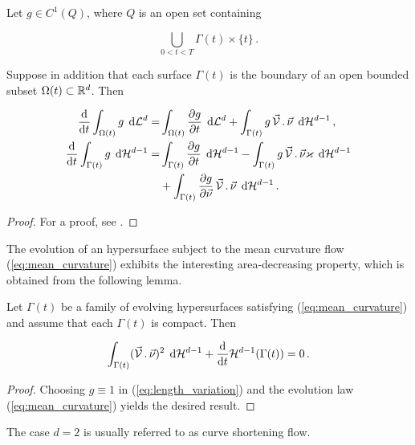 \begin{lemma}
Let $g \in C^1(Q)$, where $Q$ is an open set containing

\begin{equation}
\bigcup_{0 < t < T} \Gamma(t) \times \{ t \} \, .
\end{equation}

Suppose in addition that each surface $\Gamma(t)$ is the boundary of an open
bounded subset $\Omega(t) \subset {\mathbb R}^d$. Then

\begin{align}
\frac{\rm d}{{\rm d}t} \int_{\Omega(t)} g \, \;{\rm d}{\cal L}^{d}  = &
\int_{\Omega(t)} \frac{\partial g}{\partial t} \, \;{\rm d}{\cal L}^{d}
+ \int_{\Gamma(t)} g \,\vec{\mathcal{V}}\,.\,\vec\nu \, \;{\rm d}{\cal H}^{d-1} \, ,
\label{eq:volume_variation} \\
\frac{\rm d}{{\rm d}t} \int_{\Gamma(t)} g \, \;{\rm d}{\cal H}^{d-1}  = &
\int_{\Gamma(t)} \frac{\partial g}{\partial t} \, \;{\rm d}{\cal H}^{d-1} -
\int_{\Gamma(t)} g \, \vec{\mathcal{V}}\,.\,\vec\nu \varkappa \, \;{\rm d}{\cal H}^{d-1}
\nonumber \\
& + \int_{\Gamma(t)} \frac{\partial g}{\partial \vec \nu}\,
\vec{\mathcal{V}}\,.\,\vec\nu \, \;{\rm d}{\cal H}^{d-1} \, .
\label{eq:length_variation}
\end{align}
\end{lemma}

\begin{proof}
For a proof, see \cite[\S~2.6, Lemma 2.1]{DeckelnickDE05}.
\end{proof}

The evolution of an hypersurface subject to the mean curvature flow
(\ref{eq:mean_curvature}) exhibits the interesting area-decreasing property,
which is obtained from the following lemma.

\begin{lemma}
Let $\Gamma(t)$ be a family of evolving hypersurfaces
satisfying (\ref{eq:mean_curvature}) and assume that each $\Gamma(t)$ is
compact. Then

\begin{equation}
\int_{\Gamma(t)} (\vec{\mathcal{V}}\,.\,\vec\nu)^2 \, \;{\rm d}{\cal H}^{d-1} +
\frac{\rm d}{{\rm d}t} \mathcal{H}^{d-1}(\Gamma(t)) = 0 \, . \label{eq:length_decrease}
\end{equation}

\end{lemma}

\begin{proof}
Choosing $g \equiv 1$ in (\ref{eq:length_variation}) and the evolution law
(\ref{eq:mean_curvature}) yields the desired result.
\end{proof}
The case $d = 2$ is usually referred to as curve shortening flow.

